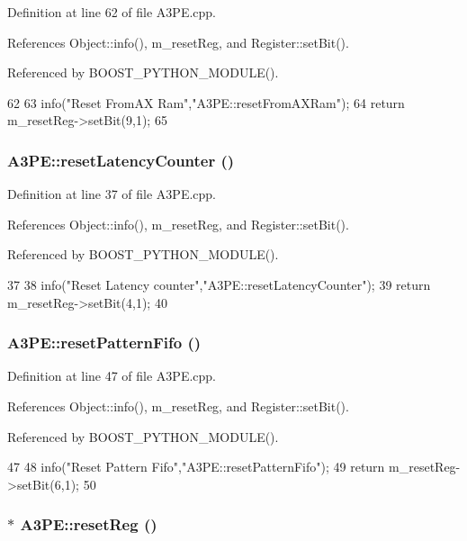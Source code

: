 Definition at line 62 of file A3PE.cpp.

References Object::info(), m\_\-resetReg, and Register::setBit().

Referenced by BOOST\_\-PYTHON\_\-MODULE().


\begin{DoxyCode}
62                                {
63   info("Reset FromAX Ram","A3PE::resetFromAXRam");
64   return m_resetReg->setBit(9,1);
65 }
\end{DoxyCode}
\hypertarget{classA3PE_a44c50d822ac4f5d8f2b8ed75c5b90580}{
\subsubsection[{resetLatencyCounter}]{ A3PE::resetLatencyCounter ()}}
\label{classA3PE_a44c50d822ac4f5d8f2b8ed75c5b90580}


Definition at line 37 of file A3PE.cpp.

References Object::info(), m\_\-resetReg, and Register::setBit().

Referenced by BOOST\_\-PYTHON\_\-MODULE().


\begin{DoxyCode}
37                                     {
38   info("Reset Latency counter","A3PE::resetLatencyCounter");
39   return m_resetReg->setBit(4,1);
40 }
\end{DoxyCode}
\hypertarget{classA3PE_a4e5b677dd2872428abf3d64ef7a769c1}{
\subsubsection[{resetPatternFifo}]{ A3PE::resetPatternFifo ()}}
\label{classA3PE_a4e5b677dd2872428abf3d64ef7a769c1}


Definition at line 47 of file A3PE.cpp.

References Object::info(), m\_\-resetReg, and Register::setBit().

Referenced by BOOST\_\-PYTHON\_\-MODULE().


\begin{DoxyCode}
47                                  {
48   info("Reset Pattern Fifo","A3PE::resetPatternFifo");
49   return m_resetReg->setBit(6,1);
50 }
\end{DoxyCode}
\hypertarget{classA3PE_afd34bfbfd92838717c7cdec856b2a0b2}{
\subsubsection[{resetReg}]{$\ast$ A3PE::resetReg ()}}
\label{classA3PE_afd34bfbfd92838717c7cdec856b2a0b2}


